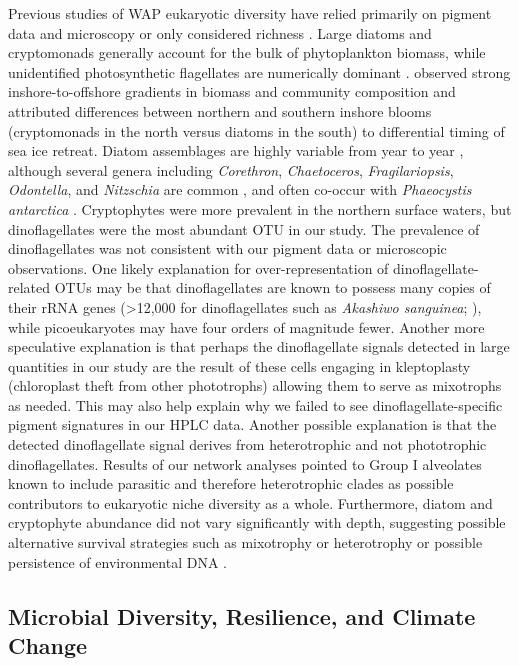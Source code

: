 Previous studies of WAP eukaryotic diversity have relied primarily on pigment data and microscopy \citep{rvz02, rjbf02, gvfsrq03, gvkf03, acccg10} or only considered richness \citep{amdh09}. Large diatoms and cryptomonads generally account for the bulk of phytoplankton biomass, while unidentified photosynthetic flagellates are numerically dominant \citep{vhh93, rjbf02, gvkf03, acccg10}. \citet{gvkf03} observed strong inshore-to-offshore gradients in biomass and community composition and attributed differences between northern and southern inshore blooms (cryptomonads in the north versus diatoms in the south) to differential timing of sea ice retreat. Diatom assemblages are highly variable from year to year \citep{acccg10}, although several genera including \textit{Corethron}, \textit{Chaetoceros}, \textit{Fragilariopsis}, \textit{Odontella}, and \textit{Nitzschia} are common \citep{gvfsrq03,acccg10}, and often co-occur with \textit{Phaeocystis antarctica} \citep{rjbf02, gvkf03}. Cryptophytes were more prevalent in the northern surface waters, but dinoflagellates were the most abundant OTU in our study. The prevalence of dinoflagellates was not consistent with our pigment data or microscopic observations. One likely explanation for over-representation of dinoflagellate-related OTUs may be that dinoflagellates are known to possess many copies of their rRNA genes (\textgreater{}12,000 for dinoflagellates such as \textit{Akashiwo sanguinea}; \citealt{zmnmv05}), while picoeukaryotes may have four orders of magnitude fewer. Another more speculative explanation is that perhaps the dinoflagellate signals detected in large quantities in our study are the result of these cells engaging in kleptoplasty (chloroplast theft from other phototrophs) \citep{gmdc07} allowing them to serve as mixotrophs as needed. This may also help explain why we failed to see dinoflagellate-specific pigment signatures in our HPLC data. Another possible explanation is that the detected dinoflagellate signal derives from heterotrophic and not phototrophic dinoflagellates. Results of our network analyses pointed to Group I alveolates known to include parasitic and therefore heterotrophic clades as possible contributors to eukaryotic niche diversity as a whole. Furthermore, diatom and cryptophyte abundance did not vary significantly with depth, suggesting possible alternative survival strategies such as mixotrophy or heterotrophy \citep{bacccgps00,tsrg06} or possible persistence of environmental DNA \citep{cvcl12,cvl12}.

\subsection{Microbial Diversity, Resilience, and Climate Change}\label{microbial-diversity-resilience-and-climate-change}

